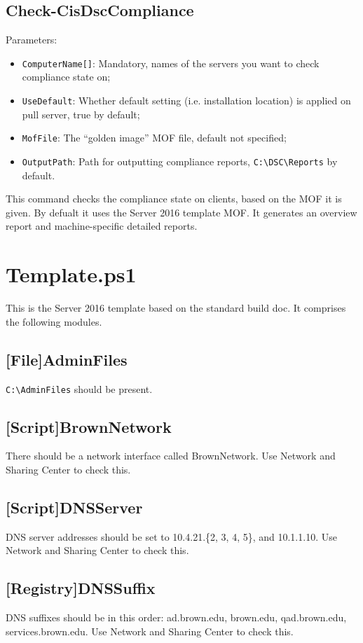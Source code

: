     \subsection{Check-CisDscCompliance}
      Parameters:
      \begin{itemize}
        \item \verb^ComputerName[]^: Mandatory, names of the servers you want to check compliance state on;
        \item \verb^UseDefault^: Whether default setting (i.e. installation location) is applied on pull server, true by default;
        \item \verb^MofFile^: The ``golden image'' MOF file, default not specified; 
        \item \verb^OutputPath^: Path for outputting compliance reports,
        \verb^C:\DSC\Reports^ by default.
      \end{itemize}
      This command checks the compliance state on clients, based on the MOF it is given. By defualt it uses the Server 2016 template MOF. It generates an overview report and machine-specific detailed reports.

  \section{Template.ps1}
    This is the Server 2016 template based on the standard build doc. It comprises the following modules.
    \subsection{[File]AdminFiles}
      \verb^C:\AdminFiles^ should be present.
    \subsection{[Script]BrownNetwork}
      There should be a network interface called BrownNetwork. Use Network and Sharing Center to check this.
    \subsection{[Script]DNSServer}
      DNS server addresses should be set to 10.4.21.\{2, 3, 4, 5\}, and 10.1.1.10. Use Network and Sharing Center to check this.
    \subsection{[Registry]DNSSuffix}
      DNS suffixes should be in this order: ad.brown.edu, brown.edu, qad.brown.edu, services.brown.edu. Use Network and Sharing Center to check this.
